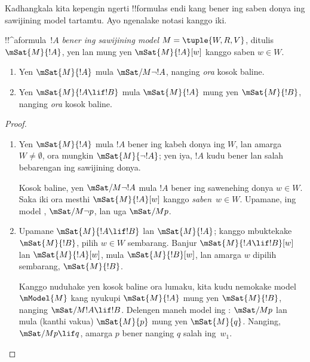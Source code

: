 \documentclass[../../../include/open-logic-section]{subfiles}
\begin{document}


Kadhangkala kita kepengin ngerti !!{formula}s endi kang bener
ing saben donya ing sawijining model tartamtu. Ayo ngenalake
notasi kanggo iki.

\begin{defn}
  !!^a{formula}~$!A$ \emph{bener ing sawijining model} $M = \tuple{W, R,
    V}$, ditulis $\mSat{M}{!A}$, yen lan mung yen $\mSat{M}{!A}[w]$
  kanggo saben $w \in W$.
\end{defn}

\begin{prop}
  \begin{enumerate}
  \item Yen $\mSat{M}{!A}$ mula $\mSat/{M}{\lnot !A}$, nanging \emph{ora}
    kosok baline.
  \item Yen $\mSat{M}{!A \lif !B}$ mula $\mSat{M}{!A}$ mung yen
    $\mSat{M}{!B}$, nanging \emph{ora} kosok baline.
  \end{enumerate}
\end{prop}

\begin{proof}
  \begin{enumerate}
  \item Yen $\mSat{M}{!A}$ mula $!A$ bener ing kabeh donya ing $W$, lan
    amarga $W \neq \emptyset$, ora mungkin $\mSat{M}{\lnot!A}$; yen
    iya, $!A$ kudu bener lan salah bebarengan ing sawijining
    donya.

Kosok baline, yen $\mSat/{M}{\lnot !A}$ mula $!A$ bener ing
    sawenehing donya $w \in W$. Saka iki ora mesthi $\mSat{M}{!A}[w]$
    kanggo \emph{saben}~$w \in W$. Upamane, ing model
    , $\mSat/{M}{\lnot p}$, lan uga $\mSat/{M}{p}$.
  \item Upamane $\mSat{M}{!A \lif !B}$ lan $\mSat{M}{!A}$; kanggo mbuktekake
    $\mSat{M}{!B}$, pilih $w \in W$ sembarang. Banjur
    $\mSat{M}{!A \lif !B}[w]$ lan $\mSat{M}{!A}[w]$, mula
    $\mSat{M}{!B}[w]$, lan amarga $w$ dipilih sembarang,
    $\mSat{M}{!B}$.

Kanggo nuduhake yen kosok baline ora lumaku, kita kudu nemokake model
    $\mModel{M}$ kang nyukupi $\mSat{M}{!A}$ mung yen $\mSat{M}{!B}$, nanging
    $\mSat/{M}{!A \lif !B}$. Delengen maneh model ing
    : $\mSat/{M}{p}$ lan mula (kanthi vakua)
    $\mSat{M}{p}$ mung yen $\mSat{M}{q}$. Nanging, $\mSat/{M}{p \lif
      q}$, amarga $p$ bener nanging $q$ salah ing~$w_1$.
  \end{enumerate}
\end{proof}
\end{document}
